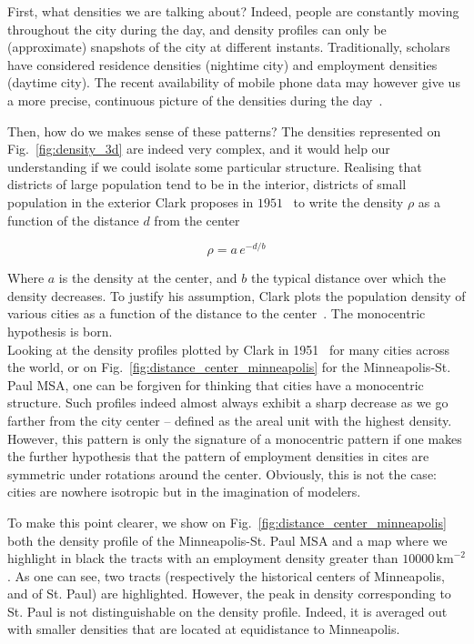 First, what densities we are talking about? Indeed, people are constantly moving
throughout the city during the day, and density profiles can only be
(approximate) snapshots of the city at different instants. Traditionally,
scholars have considered residence densities (nightime city) and employment
densities (daytime city). The recent availability of mobile phone data 
may however give us a more precise, continuous picture of the
densities during the day~\cite{Louail:2014}.


Then, how do we makes sense of these patterns? The densities
represented on Fig.~\ref{fig:density_3d} are indeed very complex, and it would
help our understanding if we could isolate some particular structure.
Realising that districts of large population tend to be in the interior,
districts of small population in the exterior Clark proposes in
$1951$~\cite{Clark:1951} to write the density $\rho$ as a function of the
distance $d$ from the center

\begin{equation}
    \rho = a\,e^{-d/b} 
\end{equation}

Where $a$ is the density at the center, and $b$ the typical distance over which
the density decreases. To justify his assumption, Clark plots the population
density of various cities as a function of the distance to the
center~\cite{Clark:1951}. The monocentric hypothesis is born.\\

Looking at the density profiles plotted by Clark in 1951~\cite{Clark:1951} for
many cities across the world, or on Fig.~\ref{fig:distance_center_minneapolis}
for the Minneapolis-St. Paul MSA, one can be
forgiven for thinking that cities have a monocentric structure. Such profiles
indeed almost always exhibit a sharp decrease as we go farther from the city
center -- defined as the areal unit with the highest density. However, this
pattern is only the signature of a monocentric pattern if one makes the further
hypothesis that the pattern of employment densities in cites are symmetric
under rotations around the center. Obviously, this is not the case: cities are
nowhere isotropic but in the imagination of modelers. 

To make this point clearer, we show on
Fig.~\ref{fig:distance_center_minneapolis} both the density profile of the
Minneapolis-St. Paul MSA and a map where we highlight in black the tracts with
an employment density greater than $10000\,\text{km}^{-2}$. As one can see, two
tracts (respectively the historical centers of Minneapolis, and of St. Paul) are
highlighted. However, the peak in density corresponding to St. Paul is not
distinguishable on the density profile. Indeed, it is averaged out with smaller
densities that are located at equidistance to Minneapolis.

